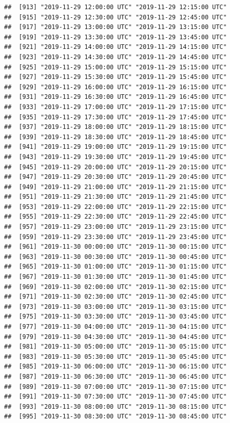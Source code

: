 \documentclass{article}\usepackage[]{graphicx}\usepackage[]{color}
\makeatletter
\newenvironment{kframe}{%
 \def\at@end@of@kframe{}%
 \ifinner\ifhmode%
  \def\at@end@of@kframe{\end{minipage}}%
  \begin{minipage}{\columnwidth}%
 \fi\fi%
 \def\FrameCommand##1{\hskip\@totalleftmargin \hskip-\fboxsep
 \colorbox{shadecolor}{##1}\hskip-\fboxsep
     \hskip-\linewidth \hskip-\@totalleftmargin \hskip\columnwidth}%
 \MakeFramed {\advance\hsize-\width
   \@totalleftmargin\z@ \linewidth\hsize
   \@setminipage}}%
 {\par\unskip\endMakeFramed%
 \at@end@of@kframe}
\newenvironment{knitrout}{}{} %
\makeatother
\begin{document}
\begin{knitrout}
\begin{kframe}
\begin{verbatim}
##  [913] "2019-11-29 12:00:00 UTC" "2019-11-29 12:15:00 UTC"
##  [915] "2019-11-29 12:30:00 UTC" "2019-11-29 12:45:00 UTC"
##  [917] "2019-11-29 13:00:00 UTC" "2019-11-29 13:15:00 UTC"
##  [919] "2019-11-29 13:30:00 UTC" "2019-11-29 13:45:00 UTC"
##  [921] "2019-11-29 14:00:00 UTC" "2019-11-29 14:15:00 UTC"
##  [923] "2019-11-29 14:30:00 UTC" "2019-11-29 14:45:00 UTC"
##  [925] "2019-11-29 15:00:00 UTC" "2019-11-29 15:15:00 UTC"
##  [927] "2019-11-29 15:30:00 UTC" "2019-11-29 15:45:00 UTC"
##  [929] "2019-11-29 16:00:00 UTC" "2019-11-29 16:15:00 UTC"
##  [931] "2019-11-29 16:30:00 UTC" "2019-11-29 16:45:00 UTC"
##  [933] "2019-11-29 17:00:00 UTC" "2019-11-29 17:15:00 UTC"
##  [935] "2019-11-29 17:30:00 UTC" "2019-11-29 17:45:00 UTC"
##  [937] "2019-11-29 18:00:00 UTC" "2019-11-29 18:15:00 UTC"
##  [939] "2019-11-29 18:30:00 UTC" "2019-11-29 18:45:00 UTC"
##  [941] "2019-11-29 19:00:00 UTC" "2019-11-29 19:15:00 UTC"
##  [943] "2019-11-29 19:30:00 UTC" "2019-11-29 19:45:00 UTC"
##  [945] "2019-11-29 20:00:00 UTC" "2019-11-29 20:15:00 UTC"
##  [947] "2019-11-29 20:30:00 UTC" "2019-11-29 20:45:00 UTC"
##  [949] "2019-11-29 21:00:00 UTC" "2019-11-29 21:15:00 UTC"
##  [951] "2019-11-29 21:30:00 UTC" "2019-11-29 21:45:00 UTC"
##  [953] "2019-11-29 22:00:00 UTC" "2019-11-29 22:15:00 UTC"
##  [955] "2019-11-29 22:30:00 UTC" "2019-11-29 22:45:00 UTC"
##  [957] "2019-11-29 23:00:00 UTC" "2019-11-29 23:15:00 UTC"
##  [959] "2019-11-29 23:30:00 UTC" "2019-11-29 23:45:00 UTC"
##  [961] "2019-11-30 00:00:00 UTC" "2019-11-30 00:15:00 UTC"
##  [963] "2019-11-30 00:30:00 UTC" "2019-11-30 00:45:00 UTC"
##  [965] "2019-11-30 01:00:00 UTC" "2019-11-30 01:15:00 UTC"
##  [967] "2019-11-30 01:30:00 UTC" "2019-11-30 01:45:00 UTC"
##  [969] "2019-11-30 02:00:00 UTC" "2019-11-30 02:15:00 UTC"
##  [971] "2019-11-30 02:30:00 UTC" "2019-11-30 02:45:00 UTC"
##  [973] "2019-11-30 03:00:00 UTC" "2019-11-30 03:15:00 UTC"
##  [975] "2019-11-30 03:30:00 UTC" "2019-11-30 03:45:00 UTC"
##  [977] "2019-11-30 04:00:00 UTC" "2019-11-30 04:15:00 UTC"
##  [979] "2019-11-30 04:30:00 UTC" "2019-11-30 04:45:00 UTC"
##  [981] "2019-11-30 05:00:00 UTC" "2019-11-30 05:15:00 UTC"
##  [983] "2019-11-30 05:30:00 UTC" "2019-11-30 05:45:00 UTC"
##  [985] "2019-11-30 06:00:00 UTC" "2019-11-30 06:15:00 UTC"
##  [987] "2019-11-30 06:30:00 UTC" "2019-11-30 06:45:00 UTC"
##  [989] "2019-11-30 07:00:00 UTC" "2019-11-30 07:15:00 UTC"
##  [991] "2019-11-30 07:30:00 UTC" "2019-11-30 07:45:00 UTC"
##  [993] "2019-11-30 08:00:00 UTC" "2019-11-30 08:15:00 UTC"
##  [995] "2019-11-30 08:30:00 UTC" "2019-11-30 08:45:00 UTC"

\end{verbatim}
\end{kframe}
\end{knitrout}
\end{document}
